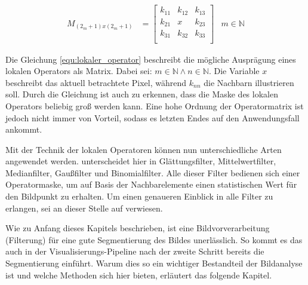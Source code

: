 \begin{align}
	\label{equ:lokaler_operator}M_{(2_m+1)x(2_m+1)} & = \begin{bmatrix}k_{11}&k_{12}&k_{13}\\ k_{21}&x&k_{23}\\ k_{31}&k_{32}&k_{33}\\\end{bmatrix} & m \in \mathbb{N}
\end{align}

Die Gleichung \ref{equ:lokaler_operator} beschreibt die mögliche Ausprägung
eines lokalen Operators als Matrix. Dabei sei:
$m \in \mathbb{N}\wedge n \in \mathbb{N}$. Die Variable $x$ beschreibt das aktuell
betrachtete Pixel, während $k_{nn}$ die Nachbarn illustrieren soll. Durch die Gleichung
ist auch zu erkennen, dass die Maske des lokalen Operators beliebig groß werden
kann. Eine hohe Ordnung der Operatormatrix ist jedoch nicht immer von Vorteil,
sodass es letzten Endes auf den Anwendungsfall ankommt.

Mit der Technik der lokalen Operatoren können nun unterschiedliche Arten
angewendet werden. \citet[S.~54 - 55]{handels2000} unterscheidet hier in
Glättungsfilter, Mittelwertfilter, Medianfilter, Gaußfilter und Binomialfilter.
Alle dieser Filter bedienen sich einer Operatormaske, um auf Basis der Nachbarelemente
einen statistischen Wert für den Bildpunkt zu erhalten. Um einen genaueren
Einblick in alle Filter zu erlangen, sei an dieser Stelle auf \citet[S.~54 - 55]{handels2000}
verwiesen.

Wie zu Anfang dieses Kapitels beschrieben, ist eine Bildvorverarbeitung (Filterung)
für eine gute Segmentierung des Bildes unerlässlich. So kommt es das auch in der
Visualisierungs-Pipeline nach \citet[S.~50]{handels2000} der zweite Schritt bereits
die Segmentierung einführt. Warum dies so ein wichtiger Bestandteil der
Bildanalyse ist und welche Methoden sich hier bieten, erläutert das folgende Kapitel.

\pagebreak

